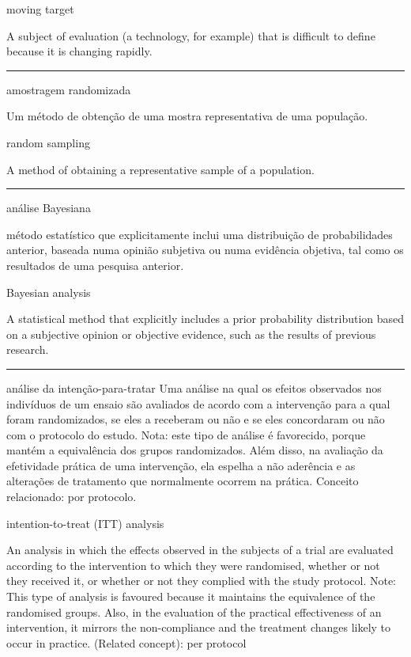 \documentclass[
]{book}
\begin{document}
moving target

A subject of evaluation (a technology, for example) that is difficult to define because it is changing rapidly.

\begin{center}\rule{0.5\linewidth}{0.5pt}\end{center}

amostragem randomizada

Um método de obtenção de uma mostra representativa de uma população.

random sampling

A method of obtaining a representative sample of a population.

\begin{center}\rule{0.5\linewidth}{0.5pt}\end{center}

análise Bayesiana

método estatístico que explicitamente inclui uma distribuição de probabilidades anterior, baseada numa opinião subjetiva ou numa evidência objetiva, tal como os resultados de uma pesquisa anterior.

Bayesian analysis

A statistical method that explicitly includes a prior probability distribution based on a subjective opinion or objective evidence, such as the results of previous research.

\begin{center}\rule{0.5\linewidth}{0.5pt}\end{center}

análise da intenção-para-tratar
Uma análise na qual os efeitos observados nos indivíduos de um ensaio são avaliados de acordo com a intervenção para a qual foram randomizados, se eles a receberam ou não e se eles concordaram ou não com o protocolo do estudo. Nota: este tipo de análise é favorecido, porque mantém a equivalência dos grupos randomizados. Além disso, na avaliação da efetividade prática de uma intervenção, ela espelha a não aderência e as alterações de tratamento que normalmente ocorrem na prática. Conceito relacionado: por protocolo.

intention-to-treat (ITT) analysis

An analysis in which the effects observed in the subjects of a trial are evaluated according to the intervention to which they were randomised, whether or not they received it, or whether or not they complied with the study protocol. Note: This type of analysis is favoured because it maintains the equivalence of the randomised groups. Also, in the evaluation of the practical effectiveness of an intervention, it mirrors the non-compliance and the treatment changes likely to occur in practice. (Related concept): per protocol
\end{document}
